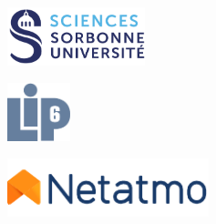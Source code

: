 

\newcommand{\jurymember}[6]{\hspace{1.5em}{#6} \textbf{{#1} {#2}}, {#3}, {#4} \hfill \textit{{#5}}\\}

\begin{titlepage}

    
    \begin{figure}
        \begin{subfigure}{.3\textwidth}
            \centering
            \includegraphics[height=1.7cm]{title_page/assets/sorbonne.pdf}
        \end{subfigure}\hfill
        \begin{subfigure}{.3\textwidth}
            \centering
            \includegraphics[height=1.7cm]{title_page/assets/LogoLIP6.pdf}
        \end{subfigure}\hfill
        \begin{subfigure}{.3\textwidth}
            \centering
            \includegraphics[height=1.7cm]{title_page/assets/netatmo_logo_color.pdf}
        \end{subfigure}
    \end{figure}
    

\end{titlepage}
